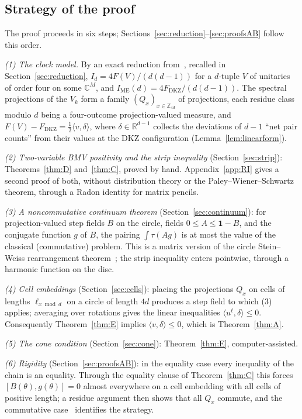 \documentclass[11pt]{amsart}
\theoremstyle{definition}
\theoremstyle{remark}
\numberwithin{equation}{section}
\newcommand{\Z}{\mathbb{Z}}
\newcommand{\R}{\mathbb{R}}
\newcommand{\C}{\mathbb{C}}
\newcommand{\FD}{F_{\mathrm{DKZ}}}
\newcommand{\IME}{I_{\mathrm{ME}}}
\newcommand{\one}{\mathbf{1}}
\newcommand{\ip}[2]{\langle #1,#2\rangle}
\begin{document}
\subsection{Strategy of the proof}\label{subsec:strategy}
The proof proceeds in six steps; Sections~\ref{sec:reduction}--\ref{sec:proofsAB} follow this order.

\emph{(1) The clock model.} By an exact reduction from~\cite{MS-classical}, recalled in Section~\ref{sec:reduction},
$I_d=4F(V)/(d(d-1))$ for a $d$-tuple $V$ of unitaries of order four on some $\C^M$, and $\IME(d)=4\FD/(d(d-1))$. The
spectral projections of the $V_k$ form a family $(Q_x)_{x\in\Z_{4d}}$ of projections, each residue class modulo $d$
being a four-outcome projection-valued measure, and $F(V)-\FD=\frac12\ip v\delta$, where $\delta\in\R^{d-1}$ collects
the deviations of $d-1$ ``net pair counts'' from their values at the DKZ configuration (Lemma~\ref{lem:linearform}).

\emph{(2) Two-variable BMV positivity and the strip inequality} (Section~\ref{sec:strip}): Theorems~\ref{thm:D}
and~\ref{thm:C}, proved by hand. Appendix~\ref{app:RI} gives a second proof of both, without distribution theory or
the Paley--Wiener--Schwartz theorem, through a Radon identity for matrix pencils.

\emph{(3) A noncommutative continuum theorem} (Section~\ref{sec:continuum}): for projection-valued step fields $B$ on
the circle, fields $0\le A\le\one-B$, and the conjugate function $g$ of $B$, the pairing $\int\tau(Ag)$ is at most
the value of the classical (commutative) problem. This is a matrix version of the circle Stein--Weiss
rearrangement theorem~\cite{SW,Laeng}; the strip inequality enters pointwise, through a harmonic function on the disc.

\emph{(4) Cell embeddings} (Section~\ref{sec:cells}): placing the projections $Q_x$ on cells of lengths
$\ell_{x\bmod d}$ on a circle of length $4d$ produces a step field to which (3) applies; averaging over rotations
gives the linear inequalities $\ip{u^\ell}\delta\le0$. Consequently Theorem~\ref{thm:E} implies $\ip v\delta\le0$,
which is Theorem~\ref{thm:A}.

\emph{(5) The cone condition} (Section~\ref{sec:cone}): Theorem~\ref{thm:E}, computer-assisted.

\emph{(6) Rigidity} (Section~\ref{sec:proofsAB}): in the equality case every inequality of the chain is an equality.
Through the equality clause of Theorem~\ref{thm:C} this forces $[B(\theta),g(\theta)]=0$ almost everywhere on a cell
embedding with all cells of positive length; a residue argument then shows that all $Q_x$ commute, and the
commutative case~\cite{MS-classical} identifies the strategy.
\end{document}
